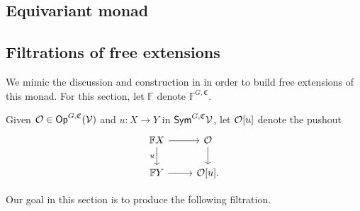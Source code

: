 \documentclass[a4paper,10pt
,draft
]{article}%
\renewcommand{\1}{\eta}%
\begin{document}
\subsection{Equivariant monad}

\subsection{Filtrations of free extensions} %

We mimic the discussion and construction in \cite[\S 5.1 - 5.3]{BP_geo}
in order to build free extensions of this monad.
For this section, let $\mathbb F$ denote $\mathbb F^{G, \mathfrak C}$.

\begin{definition}
      Given $\mathcal{O} \in \mathsf{Op}^{G, \mathfrak C}(\mathcal V)$ and $u: X \to Y$ in $\mathsf{Sym}^{G,\mathfrak C}\mathcal V$,
      let $\mathcal {\mathcal{O}}[u]$ denote the pushout
      \begin{equation}
            \begin{tikzcd}
                  \mathbb F X \arrow[d, "u"'] \arrow[r]
                  &
                  \O \arrow[d]
                  \\
                  \mathbb F Y \arrow[r]
                  &
                  \O[u].
            \end{tikzcd}
      \end{equation}
\end{definition}

Our goal in this section is to produce the following filtration.
\end{document}
